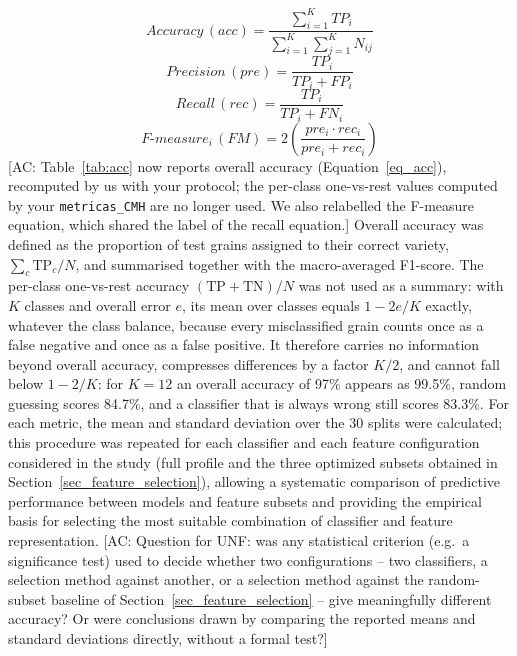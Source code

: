 \documentclass[final,5p,times,twocolumn]{elsarticle}
\newcommand{\added}[1]{{\color{blue}#1}}
\newcommand{\acnote}[1]{{\color{red}\small\textsf{[AC: #1]}}}
\begin{document}
\begin{itemize}
    \begin{equation}
        Accuracy \, (acc) = \frac{\sum_{i=1}^{K}TP_{i}}{\sum_{i=1}^{K} \sum_{j=1}^{K}N_{ij}}
        \label{eq_acc}
    \end{equation}
    \begin{equation}
        Precision \, (pre) = \frac{TP_{i}}{TP_{i} + FP_{i}}
        \label{eq_pre}
    \end{equation}
    \begin{equation}
        Recall \, (rec) =  \frac{TP_{i}}{TP_{i} + FN_{i}}
        \label{eq_rec}
    \end{equation}
    \begin{equation}
        F\text{-}measure_{i} \, (FM) =  2\left(\frac{pre_{i}\cdot rec_{i}}{pre_{i}+rec_{i}}\right)
        \label{eq_fm}
    \end{equation}
    \acnote{Table~\ref{tab:acc} now reports overall accuracy (Equation~\ref{eq_acc}), recomputed by us with your protocol; the per-class one-vs-rest values computed by your \texttt{metricas\_CMH} are no longer used. We also relabelled the F-measure equation, which shared the label of the recall equation.}
\added{Overall accuracy was defined as the proportion of test grains assigned to their correct variety, $\sum_c \mathrm{TP}_c / N$, and summarised together with the macro-averaged F1-score. The per-class one-vs-rest accuracy $(\mathrm{TP}+\mathrm{TN})/N$ was not used as a summary: with $K$ classes and overall error $e$, its mean over classes equals $1-2e/K$ exactly, whatever the class balance, because every misclassified grain counts once as a false negative and once as a false positive. It therefore carries no information beyond overall accuracy, compresses differences by a factor $K/2$, and cannot fall below $1-2/K$: for $K=12$ an overall accuracy of 97\% appears as 99.5\%, random guessing scores 84.7\%, and a classifier that is always wrong still scores 83.3\%.}
    For each metric, the mean and standard deviation over the \added{30 splits} were calculated; this procedure was repeated for each classifier and each feature configuration considered in the study (full profile and the three optimized subsets obtained in Section~\added{\ref{sec_feature_selection}}), allowing a systematic comparison of predictive performance between models and feature subsets and providing the empirical basis for selecting the most suitable combination of classifier and feature representation.
    \acnote{Question for UNF: was any statistical criterion (e.g.\ a significance test) used to decide whether two configurations -- two classifiers, a selection method against another, or a selection method against the random-subset baseline of Section~\ref{sec_feature_selection} -- give meaningfully different accuracy? Or were conclusions drawn by comparing the reported means and standard deviations directly, without a formal test?}

\end{itemize}
\end{document}
